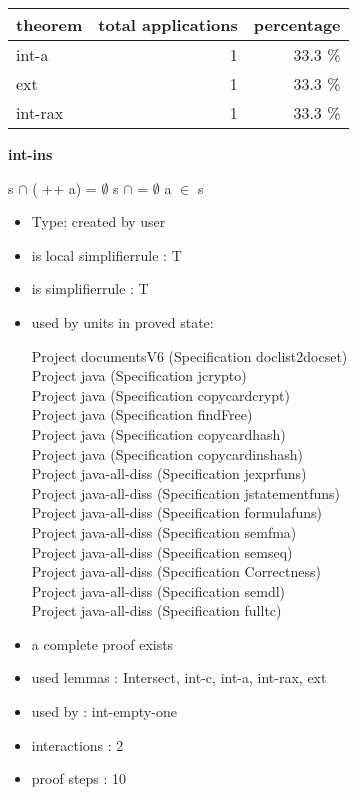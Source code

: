 \documentclass[a4paper]{article}
\begin{document}
\begin{supertabular}{l|r|r}
theorem	        & total applications & percentage \\ \hline
int-a & 1 & 33.3 \% \\
ext & 1 & 33.3 \% \\
int-rax & 1 & 33.3 \% \\

\end{supertabular}
\pagebreak

{\LARGE\bf int-ins}\label{lemma-int-ins}

\medskip

 \Fol s $\cap$ ( ++ a) = $\emptyset$ \Equiv s $\cap$  = $\emptyset$ \And \Not a $\in$ s

\begin{itemize}

\item Type: created by user

\item is local simplifierrule : T
\item is simplifierrule : T
\item used by units in proved state:

Project documentsV6 (Specification doclist2docset) \\
Project java (Specification jcrypto) \\
Project java (Specification copycardcrypt) \\
Project java (Specification findFree) \\
Project java (Specification copycardhash) \\
Project java (Specification copycardinshash) \\
Project java-all-diss (Specification jexprfuns) \\
Project java-all-diss (Specification jstatementfuns) \\
Project java-all-diss (Specification formulafuns) \\
Project java-all-diss (Specification semfma) \\
Project java-all-diss (Specification semseq) \\
Project java-all-diss (Specification Correctness) \\
Project java-all-diss (Specification semdl) \\
Project java-all-diss (Specification fulltc)
\item       a complete proof exists
\item       used lemmas  : Intersect, int-c, int-a, int-rax, ext
\item       used by      : int-empty-one
\item       interactions : 2
\item       proof steps  : 10
\end{itemize}
\end{document}
